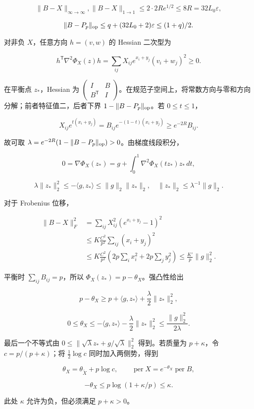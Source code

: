 \documentclass[11pt,a4paper]{article}
\begin{document}
\[\|B-X\|_{\infty\to\infty},\|B-X\|_{1\to1}
\le2\cdot2Re^{1/2}\le8R=32L_0\varepsilon,\]

\[\|B-P_p\|_{\rm op}\le q+(32L_0+2)\varepsilon\le(1+q)/2.\]

对非负 \(X\)，任意方向 \(h=(v,w)\) 的 Hessian 二次型为

\[h^{\mathsf T}\nabla^2\Phi_X(z)h
=\sum_{ij}X_{ij}e^{x_i+y_j}(v_i+w_j)^2\ge0.\]

在平衡点 \(z_*\)，Hessian 为 \(\left(\begin{smallmatrix}I&B\\B^{\mathsf T}&I\end{smallmatrix}\right)\)。在规范子空间上，将常数方向与零和方向分解；前者特征值二，后者下界 \(1-\|B-P_p\|_{\rm op}\)。若 \(0\le t\le1\)，

\[X_{ij}e^{t(x_i+y_j)}=B_{ij}e^{-(1-t)(x_i+y_j)}\ge e^{-2R}B_{ij}.\]

故可取 \(\lambda=e^{-2R}(1-\|B-P_p\|_{\rm op})>0\)。由梯度线段积分，

\[0=\nabla\Phi_X(z_*)=g+\int_0^1\nabla^2\Phi_X(tz_*)z_*\,dt,\]

\[\lambda\|z_*\|_2^2\le-\langle g,z_*\rangle\le\|g\|_2\|z_*\|_2,
\quad\|z_*\|_2\le\lambda^{-1}\|g\|_2.\]

对于 Frobenius 位移，

\[\begin{aligned}
\|B-X\|_F^2
&=\sum_{ij}X_{ij}^2(e^{x_i+y_j}-1)^2\\
&\le K\frac{C^2}{p^2}\sum_{ij}(x_i+y_j)^2\\
&\le K\frac{C^2}{p^2}\left(2p\sum_ix_i^2+2p\sum_jy_j^2\right)
\le\frac{K'}p\|g\|_2^2.
\end{aligned}\]

平衡时 \(\sum_{ij}B_{ij}=p\)，所以 \(\Phi_X(z_*)=p-\theta_X\)。强凸性给出

\[p-\theta_X\ge p+\langle g,z_*\rangle+\frac\lambda2\|z_*\|_2^2,\]

\[0\le\theta_X\le-\langle g,z_*\rangle-\frac\lambda2\|z_*\|_2^2
\le\frac{\|g\|_2^2}{2\lambda}.\]

最后一个不等式由 \(0\le\|\sqrt\lambda z_*+g/\sqrt\lambda\|_2^2\) 得到。若质量为 \(p+\kappa\)，令 \(c=p/(p+\kappa)\)；将 \(\tfrac12\log c\) 同时加入两侧势，得到

\[\theta_X=\theta_{\widetilde X}+p\log c,\qquad
\operatorname{per}X=e^{-\theta_X}\operatorname{per}B,\]

\[-\theta_X\le p\log(1+\kappa/p)\le\kappa.\]

此处 \(\kappa\) 允许为负，但必须满足 \(p+\kappa>0\)。
\end{document}
